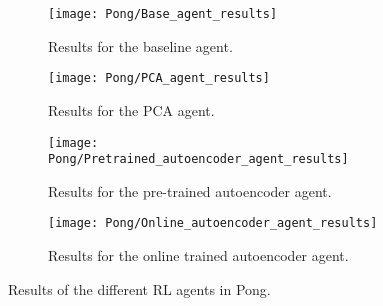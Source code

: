 \begin{figure}[h]
	\centering
	\begin{subfigure}[b]{0.49\textwidth}
		\texttt{[image: Pong/Base\_agent\_results]}
		\caption{Results for the baseline agent.}
		\label{fig:results-base-pong} 
	\end{subfigure}
	\begin{subfigure}[b]{0.49\textwidth}
		\texttt{[image: Pong/PCA\_agent\_results]}
		\caption{Results for the PCA agent.}
		\label{fig:results-pca-pong}
	\end{subfigure}
	
	\medskip
	\begin{subfigure}[b]{0.49\textwidth}
		\texttt{[image: Pong/Pretrained\_autoencoder\_agent\_results]}
		\caption{Results for the pre-trained autoencoder agent.}
		\label{fig:results-ae-pong}
	\end{subfigure}	
	\begin{subfigure}[b]{0.49\textwidth}
		\texttt{[image: Pong/Online\_autoencoder\_agent\_results]}
		\caption{Results for the online trained autoencoder agent.}
		\label{fig:results-online-ae-pong}
	\end{subfigure}
	\caption{Results of the different RL agents in Pong.}
	\label{fig:results-agents-pong}
\end{figure}

